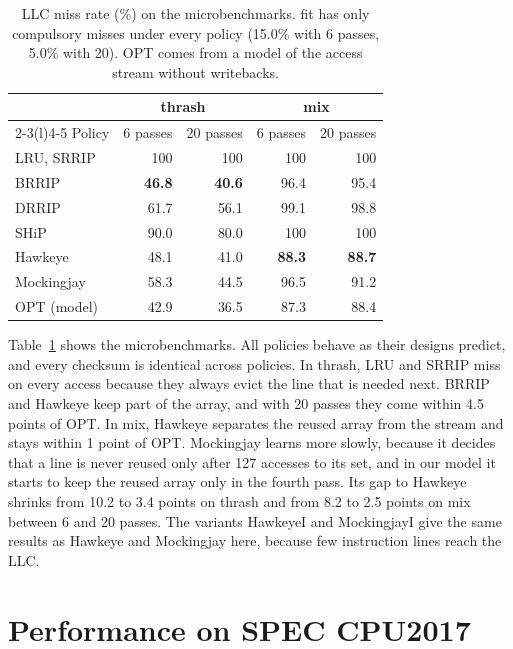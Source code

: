 \documentclass[11pt,conference]{IEEEtran}
\begin{document}
\begin{table}[t]
\centering
\caption{LLC miss rate (\%) on the microbenchmarks. fit has only compulsory
misses under every policy (15.0\% with 6 passes, 5.0\% with 20). OPT comes from
a model of the access stream without writebacks.}
\label{tab:micro}
\setlength{\tabcolsep}{4.5pt}
\begin{tabular}{@{}lrrrr@{}}
\toprule
& \multicolumn{2}{c}{thrash} & \multicolumn{2}{c}{mix} \\
\cmidrule(lr){2-3}\cmidrule(l){4-5}
Policy & 6 passes & 20 passes & 6 passes & 20 passes \\
\midrule
LRU, SRRIP & 100 & 100 & 100 & 100 \\
BRRIP & \textbf{46.8} & \textbf{40.6} & 96.4 & 95.4 \\
DRRIP & 61.7 & 56.1 & 99.1 & 98.8 \\
SHiP & 90.0 & 80.0 & 100 & 100 \\
Hawkeye & 48.1 & 41.0 & \textbf{88.3} & \textbf{88.7} \\
Mockingjay & 58.3 & 44.5 & 96.5 & 91.2 \\
\midrule
OPT (model) & 42.9 & 36.5 & 87.3 & 88.4 \\
\bottomrule
\end{tabular}
\end{table}

Table~\ref{tab:micro} shows the microbenchmarks. All policies behave as their
designs predict, and every checksum is identical across policies. In thrash, LRU and SRRIP miss on
every access because they always evict the line that is needed next. BRRIP and
Hawkeye keep part of the array, and with 20 passes they come within 4.5 points
of OPT. In mix, Hawkeye separates the reused array from the stream and stays
within 1 point of OPT. Mockingjay learns more slowly, because it decides that a
line is never reused only after 127 accesses to its set, and in our model it
starts to keep the reused array only in the fourth pass. Its gap to Hawkeye shrinks from 10.2 to 3.4 points on thrash and
from 8.2 to 2.5 points on mix between 6 and 20 passes. The variants HawkeyeI
and MockingjayI give the same results as Hawkeye and Mockingjay here, because
few instruction lines reach the LLC.

\section{Performance on SPEC CPU2017}
\label{sec:perf}
\end{document}
